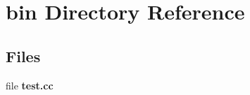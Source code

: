 \section{bin Directory Reference}
\label{dir_2ea30aa2956a8db99dd22aa5e597f384}
\subsection*{Files}
\begin{DoxyCompactItemize}
\item 
file {\bf test.\-cc}
\end{DoxyCompactItemize}
